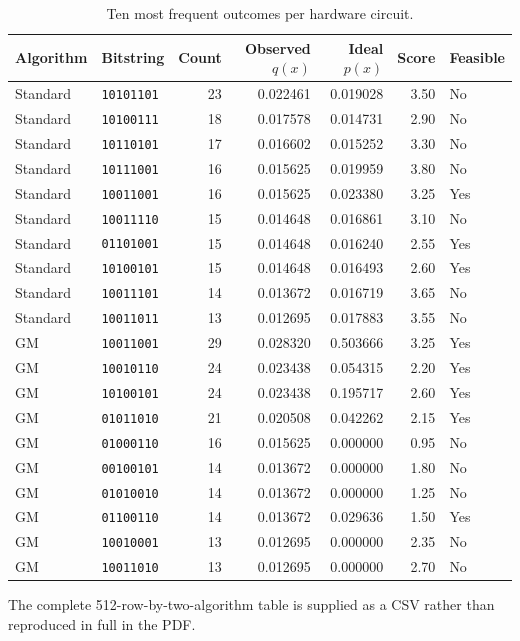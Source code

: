 \begin{table}[H]
\centering
\caption{Ten most frequent outcomes per hardware circuit.}
\scriptsize
\begin{tabular}{llrrrrl}
\toprule
Algorithm & Bitstring & Count & Observed $q(x)$ & Ideal $p(x)$ & Score & Feasible\\
\midrule
Standard & \texttt{10101101} & 23 & 0.022461 & 0.019028 & 3.50 & No\\
Standard & \texttt{10100111} & 18 & 0.017578 & 0.014731 & 2.90 & No\\
Standard & \texttt{10110101} & 17 & 0.016602 & 0.015252 & 3.30 & No\\
Standard & \texttt{10111001} & 16 & 0.015625 & 0.019959 & 3.80 & No\\
Standard & \texttt{10011001} & 16 & 0.015625 & 0.023380 & 3.25 & Yes\\
Standard & \texttt{10011110} & 15 & 0.014648 & 0.016861 & 3.10 & No\\
Standard & \texttt{01101001} & 15 & 0.014648 & 0.016240 & 2.55 & Yes\\
Standard & \texttt{10100101} & 15 & 0.014648 & 0.016493 & 2.60 & Yes\\
Standard & \texttt{10011101} & 14 & 0.013672 & 0.016719 & 3.65 & No\\
Standard & \texttt{10011011} & 13 & 0.012695 & 0.017883 & 3.55 & No\\
\midrule
GM & \texttt{10011001} & 29 & 0.028320 & 0.503666 & 3.25 & Yes\\
GM & \texttt{10010110} & 24 & 0.023438 & 0.054315 & 2.20 & Yes\\
GM & \texttt{10100101} & 24 & 0.023438 & 0.195717 & 2.60 & Yes\\
GM & \texttt{01011010} & 21 & 0.020508 & 0.042262 & 2.15 & Yes\\
GM & \texttt{01000110} & 16 & 0.015625 & 0.000000 & 0.95 & No\\
GM & \texttt{00100101} & 14 & 0.013672 & 0.000000 & 1.80 & No\\
GM & \texttt{01010010} & 14 & 0.013672 & 0.000000 & 1.25 & No\\
GM & \texttt{01100110} & 14 & 0.013672 & 0.029636 & 1.50 & Yes\\
GM & \texttt{10010001} & 13 & 0.012695 & 0.000000 & 2.35 & No\\
GM & \texttt{10011010} & 13 & 0.012695 & 0.000000 & 2.70 & No\\
\bottomrule
\end{tabular}
\end{table}

The complete 512-row-by-two-algorithm table is supplied as a CSV rather than reproduced in full in the PDF.

